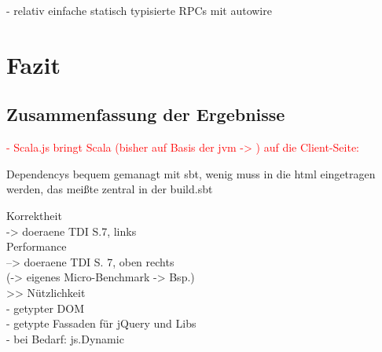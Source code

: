 \documentclass[a4paper, 12pt, hidelinks, listof=totoc, listoftables=totoc, bibliography=totoc]{scrreprt}
\newcommand{\TODO}[1]{\textcolor{red}{#1}\newline}
\begin{document}
- relativ einfache statisch typisierte RPCs mit autowire




\chapter{Fazit}\label{chap:conclusion}

 \section{Zusammenfassung der Ergebnisse}


\TODO{- Scala.js bringt Scala (bisher auf Basis der jvm -> %
) auf die Client-Seite:}


Dependencys bequem gemanagt mit sbt, wenig muss in die html eingetragen werden, das meißte zentral in der build.sbt


   Korrektheit \\
	-> doeraene TDI S.7, links \\
   Performance \\
	--> doeraene TDI S. 7, oben rechts \\
	(-> eigenes Micro-Benchmark -> Bsp.) \\
>> Nützlichkeit \\
	- getypter \ac{DOM} \\
	- getypte Fassaden für jQuery und Libs \\
	- bei Bedarf: js.Dynamic \\
\end{document}
